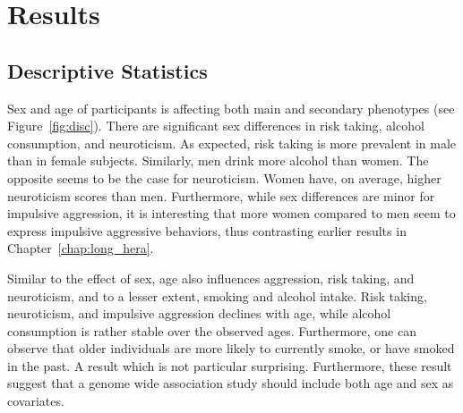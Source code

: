 \section{Results}
\label{sec:results_ukb_assoc}

\subsection{Descriptive Statistics}
\label{sub:descriptive_statistics}

Sex and age of participants is affecting both main and secondary phenotypes (see Figure~\ref{fig:disc}).
There are significant sex differences in risk taking, alcohol consumption, and neuroticism.
As expected, risk taking is more prevalent in male than in female subjects. 
Similarly, men drink more alcohol than women.
The opposite seems to be the case for neuroticism.
Women have, on average, higher neuroticism scores than men.
Furthermore,  while sex differences are minor for impulsive aggression, it is interesting that more women compared to men seem to express impulsive aggressive behaviors, thus contrasting earlier results in Chapter~\ref{chap:long_hera}. 

Similar to the effect of sex, age also influences  aggression, risk taking, and neuroticism, and to a lesser extent, smoking and alcohol intake.
Risk taking, neuroticism, and impulsive aggression declines with age, while alcohol consumption is rather stable over the observed ages.
Furthermore, one can observe that older individuals are more likely to currently smoke, or have smoked in the past.
A result which is not particular surprising.
Furthermore, these result suggest that a genome wide association study should include both age and sex as covariates.


